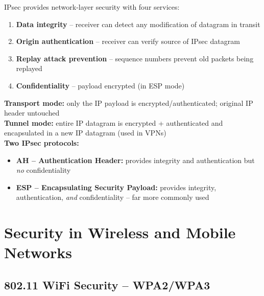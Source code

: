 \begin{tcolorbox}[keybox, title=IPsec Services]
IPsec provides network-layer security with four services:
\begin{enumerate}[noitemsep]
  \item \textbf{Data integrity} -- receiver can detect any modification of datagram in transit
  \item \textbf{Origin authentication} -- receiver can verify source of IPsec datagram
  \item \textbf{Replay attack prevention} -- sequence numbers prevent old packets being replayed
  \item \textbf{Confidentiality} -- payload encrypted (in ESP mode)
\end{enumerate}
\end{tcolorbox}

\begin{tcolorbox}[keybox, title=IPsec Modes and Protocols]
\textbf{Transport mode:} only the IP payload is encrypted/authenticated; original IP header untouched\\
\textbf{Tunnel mode:} entire IP datagram is encrypted + authenticated and encapsulated in a new IP datagram (used in VPNs)\\[6pt]
\textbf{Two IPsec protocols:}
\begin{itemize}[noitemsep]
  \item \textbf{AH -- Authentication Header:} provides integrity and authentication but \textit{no} confidentiality
  \item \textbf{ESP -- Encapsulating Security Payload:} provides integrity, authentication, \textit{and} confidentiality -- far more commonly used
\end{itemize}
\end{tcolorbox}

\begin{imagebox}
\end{imagebox}

\section{Security in Wireless and Mobile Networks}

\subsection{802.11 WiFi Security -- WPA2/WPA3}


